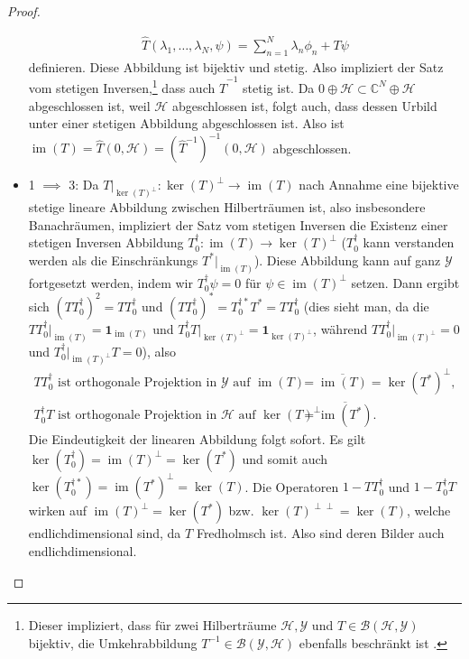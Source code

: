 \documentclass[11pt, hidelinks]{article}
\newcommand{\h}{\mathcal{H}}
\newcommand{\im}{\operatorname{im}}
\numberwithin{conj}{section}
\begin{document}
\begin{proof}
\begin{itemize}
    \begin{align}
        \hat{T}(\lambda_1, \ldots, \lambda_N, \psi) = \sum_{n=1}^{N} \lambda_n \phi_n + T\psi
    \end{align}
    definieren. Diese Abbildung ist bijektiv und stetig. Also impliziert der Satz vom stetigen Inversen,\footnote{Dieser impliziert, dass für zwei Hilberträume $\h,\mathcal{Y}$ und $T \in \mathcal{B}(\h,\mathcal{Y})$ bijektiv, die Umkehrabbildung $T^{-1} \in \mathcal{B}(\mathcal{Y},\h)$ ebenfalls beschränkt ist \cite[Korollar 3.24]{lechner}.} dass auch $\hat{T}^{-1}$ stetig ist. Da $0 \oplus \h \subset \mathbb{C}^N \oplus \h$ abgeschlossen ist, weil $\h$ abgeschlossen ist, folgt auch, dass dessen Urbild unter einer stetigen Abbildung abgeschlossen ist. Also ist $\im(T) = \hat{T}(0,\h) = (\hat{T}^{-1})^{-1}(0,\h)$ abgeschlossen.
    \item 1 $\implies$ 3: Da $T\vert_{\ker(T)^\perp}: \ker(T)^\perp \to \im(T)$ nach Annahme eine bijektive stetige lineare Abbildung zwischen Hilberträumen ist, also insbesondere Banachräumen, impliziert der Satz vom stetigen Inversen \cite[Korollar 3.24]{lechner} die Existenz einer stetigen Inversen Abbildung $T^\dagger_0: \im(T) \to \ker(T)^\perp$ ($T^\dagger_0$ kann verstanden werden als die Einschränkungs $T^\ast\vert_{\im(T)}$). Diese Abbildung kann auf ganz $\mathcal{Y}$ fortgesetzt werden, indem wir $T^\dagger_0 \psi = 0$ für $\psi \in \im(T)^\perp$ setzen. Dann ergibt sich $(TT^\dagger_0)^2 = TT^\dagger_0$ und $(TT^\dagger_0)^\ast = T^{\dagger\ast}_0 T^\ast =  TT^\dagger_0$ (dies sieht man, da die $TT^\dagger_0\vert_{\im(T)} = \mathbf{1}_{\im(T)}$ und $T^\dagger_0T\vert_{\ker(T)^\perp} = \mathbf{1}_{\ker(T)^\perp}$, während $TT^\dagger_0\vert_{\im(T)^\perp} = 0$ und $T^\dagger_0\vert_{\im(T)^\perp}T = 0$), also
    \begin{align*}
        TT^\dagger_0  \text{ ist orthogonale Projektion in $\mathcal{Y}$ auf } \im(T) &= \overline{\im(T)} = \ker(T^\ast)^\perp, \\
        T^\dagger_0 T \text{ ist orthogonale Projektion in $\h$ auf } \ker(T)^\perp &= \overline{\im(T^\ast)}.
    \end{align*}
    Die Eindeutigkeit der linearen Abbildung folgt sofort. Es gilt $\ker(T_0^\dagger) = \im(T)^\perp = \ker(T^\ast)$ und somit auch $\ker(T_0^{\dagger\ast}) = \im(T^\ast)^\perp = \ker(T)$. Die Operatoren $1-TT^\dagger_0$ und $1-T^\dagger_0 T$ wirken auf $\im(T)^\perp = \ker(T^\ast)$ bzw. $\ker(T)^{\perp\perp} = \ker(T)$, welche endlichdimensional sind, da $T$ Fredholmsch ist. Also sind deren Bilder auch endlichdimensional.

\end{itemize}
\end{proof}
\end{document}
